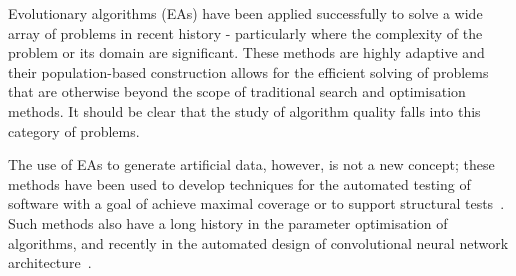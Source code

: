 
Evolutionary algorithms (EAs) have been applied successfully to solve a wide
array of problems in recent history \-- particularly where the complexity of the
problem or its domain are significant. These methods are highly adaptive and
their population-based construction allows for the efficient solving of problems
that are otherwise beyond the scope of traditional search and optimisation
methods. It should be clear that the study of algorithm quality falls into this
category of problems.


The use of EAs to generate artificial data, however, is not a new concept; these
methods have been used to develop techniques for the automated testing of
software with a goal of achieve maximal coverage or to support structural
tests~\cite{Koleejan2015,Michael2001,Sharifipour2018}. Such methods also have
a long history in the parameter optimisation of algorithms, and recently in the
automated design of convolutional neural network
architecture~\cite{Suganuma2017,Sun2018}. 
